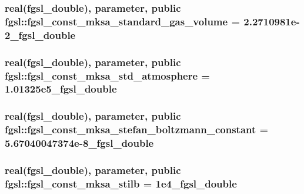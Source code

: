 \subsubsection[{fgsl\+\_\+const\+\_\+mksa\+\_\+standard\+\_\+gas\+\_\+volume}]{\setlength{\rightskip}{0pt plus 5cm}real({\bf fgsl\+\_\+double}), parameter, public fgsl\+::fgsl\+\_\+const\+\_\+mksa\+\_\+standard\+\_\+gas\+\_\+volume = 2.\+2710981e-\/2\+\_\+fgsl\+\_\+double}\label{namespacefgsl_a43547e219346197d5b5b8c6adff614eb}
\hypertarget{namespacefgsl_ae2440545adbbcd420b11d8e12db0a681}{}
\subsubsection[{fgsl\+\_\+const\+\_\+mksa\+\_\+std\+\_\+atmosphere}]{\setlength{\rightskip}{0pt plus 5cm}real({\bf fgsl\+\_\+double}), parameter, public fgsl\+::fgsl\+\_\+const\+\_\+mksa\+\_\+std\+\_\+atmosphere = 1.\+01325e5\+\_\+fgsl\+\_\+double}\label{namespacefgsl_ae2440545adbbcd420b11d8e12db0a681}
\hypertarget{namespacefgsl_a730c5b5646585a81247eaa92703505da}{}
\subsubsection[{fgsl\+\_\+const\+\_\+mksa\+\_\+stefan\+\_\+boltzmann\+\_\+constant}]{\setlength{\rightskip}{0pt plus 5cm}real({\bf fgsl\+\_\+double}), parameter, public fgsl\+::fgsl\+\_\+const\+\_\+mksa\+\_\+stefan\+\_\+boltzmann\+\_\+constant = 5.\+67040047374e-\/8\+\_\+fgsl\+\_\+double}\label{namespacefgsl_a730c5b5646585a81247eaa92703505da}
\hypertarget{namespacefgsl_a744ee71f71c6df7add4526f13316e982}{}
\subsubsection[{fgsl\+\_\+const\+\_\+mksa\+\_\+stilb}]{\setlength{\rightskip}{0pt plus 5cm}real({\bf fgsl\+\_\+double}), parameter, public fgsl\+::fgsl\+\_\+const\+\_\+mksa\+\_\+stilb = 1e4\+\_\+fgsl\+\_\+double}\label{namespacefgsl_a744ee71f71c6df7add4526f13316e982}
\hypertarget{namespacefgsl_a273648685fb01a8fa87760688d2be8aa}{}
